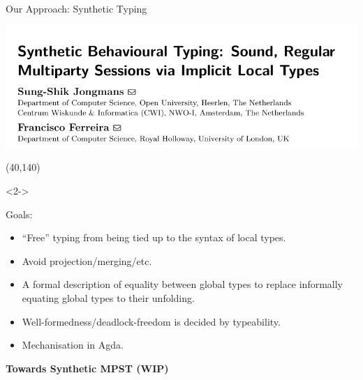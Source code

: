 \begin{frame}{Our Approach: Synthetic Typing}
    \begin{minipage}{.86\columnwidth}
    \begin{sticky}
  \includegraphics[width=\textwidth]{figures/fs-synthetic.pdf}
    \end{sticky}
    \end{minipage}

  \Put(40,140){%
    \begin{onlyenv}<2->
    \begin{minipage}{.86\columnwidth}
      \begin{greenbox}
        Goals:
        \begin{itemize}
          \item ``Free'' typing from being tied up to the syntax of local types.
          \item Avoid projection/merging/etc.
\item A formal description of equality
  between global types to replace informally equating global types to
  their unfolding.
          \item Well-formedness/deadlock-freedom is decided by typeability.
          \item Mechanisation in Agda.
        \end{itemize}
      \end{greenbox}
    \end{minipage}
    \end{onlyenv}
   }
\end{frame}


\begin{frame}
  \vfill
  \centering
  \begin{sticky}
    {\normalfont \textbf{Towards Synthetic MPST (WIP)}}
    \par%
  \end{sticky}
  \vfill
\end{frame}

